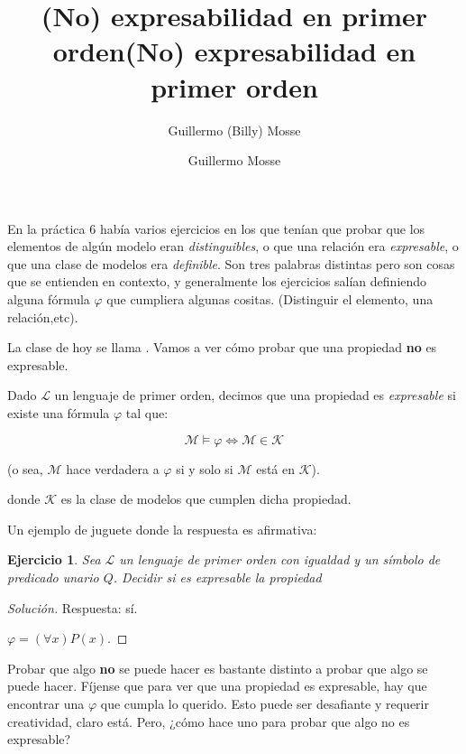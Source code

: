 \documentclass[10pt,a4paper]{article}
\author{Guillermo (Billy) Mosse}
\title{(No) expresabilidad en primer orden}
\def\l{\mathcal{L}}
\def\m{\mathcal{M}}
\def\k{\mathcal{K}}
\newenvironment{solution}
  {\renewcommand\qedsymbol{$\blacksquare$}\begin{proof}[Solución]}
  {\end{proof}}
\newtheorem{xca}{Ejercicio}
\begin{document}
\title{(No) expresabilidad en primer orden}
\author{Guillermo Mosse}

\maketitle

En la práctica 6 había varios ejercicios en los que tenían que probar que los elementos de algún modelo eran \emph{distinguibles}, o que una relación era \emph{expresable}, o que una clase de modelos era \emph{definible}. Son tres palabras distintas pero son cosas que se entienden en contexto, y generalmente los ejercicios salían definiendo alguna fórmula $\varphi$ que cumpliera algunas cositas. (Distinguir el elemento, una relación,etc).

La clase de hoy se llama . Vamos a ver cómo probar que una propiedad \textbf{no} es expresable.

\begin{definition}
Dado $\l$ un lenguaje de primer orden, decimos que una propiedad es \emph{expresable} si existe una fórmula $\varphi$ tal que:

\begin{equation*}
\m \vDash \varphi \Leftrightarrow \m \in \k
\end{equation*}
\end{definition}

(o sea, $\m$ hace verdadera a $\varphi$ si y solo si $\m$ está en $\k$).

donde $\k$ es la clase de modelos que cumplen dicha propiedad. \bigskip

Un ejemplo de juguete donde la respuesta es afirmativa:

\begin{xca}
Sea $\l$ un lenguaje de primer orden con igualdad y un símbolo de predicado unario $Q$. Decidir si es expresable la propiedad 
\end{xca}

\begin{solution}
Respuesta: sí.

$\varphi = (\forall x) P(x)$.
\end{solution}

Probar que algo \textbf{no} se puede hacer es bastante distinto a probar que algo se puede hacer. Fíjense que para ver que una propiedad es expresable, hay que encontrar una $\varphi$ que cumpla lo querido. Esto puede ser desafiante y requerir creatividad, claro está. Pero, ¿cómo hace uno para probar que algo no es expresable?
\end{document}
